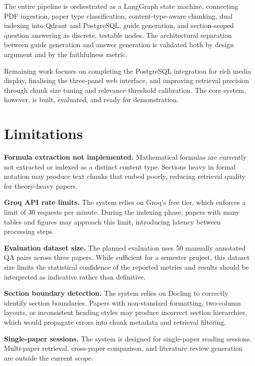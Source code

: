 \documentclass[12pt,a4paper]{report}
\begin{document}
The entire pipeline is orchestrated as a LangGraph state machine, connecting PDF
ingestion, paper type classification, content-type-aware chunking, dual indexing
into Qdrant and PostgreSQL, guide generation, and section-scoped question
answering as discrete, testable nodes. The architectural separation between guide
generation and answer generation is validated both by design argument and by the
faithfulness metric.

Remaining work focuses on completing the PostgreSQL integration for rich media
display, finalising the three-panel web interface, and improving retrieval
precision through chunk size tuning and relevance threshold calibration. The core
system, however, is built, evaluated, and ready for demonstration.

\section{Limitations}

\textbf{Formula extraction not implemented.} Mathematical formulas are currently
not extracted or indexed as a distinct content type. Sections heavy in formal
notation may produce text chunks that embed poorly, reducing retrieval quality
for theory-heavy papers.

\textbf{Groq API rate limits.} The system relies on Groq's free tier, which
enforces a limit of 30 requests per minute. During the indexing phase, papers
with many tables and figures may approach this limit, introducing latency between
processing steps.

\textbf{Evaluation dataset size.} The planned evaluation uses 50 manually
annotated QA pairs across three papers. While sufficient for a semester project,
this dataset size limits the statistical confidence of the reported metrics and
results should be interpreted as indicative rather than definitive.

\textbf{Section boundary detection.} The system relies on Docling to correctly
identify section boundaries. Papers with non-standard formatting, two-column
layouts, or inconsistent heading styles may produce incorrect section
hierarchies, which would propagate errors into chunk metadata and retrieval
filtering.

\textbf{Single-paper sessions.} The system is designed for single-paper reading
sessions. Multi-paper retrieval, cross-paper comparison, and literature review
generation are outside the current scope.
\end{document}
